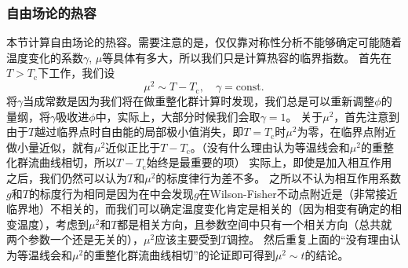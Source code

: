 \documentclass[hyperref, UTF8, a4paper]{ctexart}
\newcommand*{\const}{\mathrm{const}}
\renewcommand{\autoref}{\prettyref}
\begin{document}
\subsubsection{自由场论的热容}

本节计算自由场论的热容。需要注意的是，仅仅靠对称性分析不能够确定可能随着温度变化的系数$\gamma$, $\mu$等具体有多大，所以我们只是计算热容的临界指数。
首先在$T > T_\text{c}$下工作，我们设
\begin{equation}
    \mu^2 \sim T - T_\text{c}, \quad \gamma = \const.    
    \label{eq:mf-parameter-assumption}
\end{equation}
将$\gamma$当成常数是因为我们将在做重整化群计算时发现，我们总是可以重新调整$\phi$的量纲，将$\gamma$吸收进$\phi$中，实际上，大部分时候我们会取$\gamma=1$。
关于$\mu^2$，首先注意到由于$T$越过临界点时自由能的局部极小值消失，即$T=T_\text{c}$时$\mu^2$为零，在临界点附近做小量近似，就有$\mu^2$近似正比于$T-T_\text{c}$。（没有什么理由认为等温线会和$\mu^2$的重整化群流曲线相切，所以$T-T_\text{c}$始终是最重要的项）
实际上，即使是加入相互作用之后，我们仍然可以认为$T$和$\mu^2$的标度律行为差不多。
之所以不认为相互作用系数$g$和$T$的标度行为相同是因为在\autoref{sec:4-epsilon}中会发现$g$在Wilson-Fisher不动点附近是（非常接近临界地）不相关的，而我们可以确定温度变化肯定是相关的（因为相变有确定的相变温度），考虑到$\mu^2$和$T$都是相关方向，且参数空间中只有一个相关方向（总共就两个参数一个还是无关的），$\mu^2$应该主要受到$T$调控。
然后重复上面的“没有理由认为等温线会和$\mu^2$的重整化群流曲线相切”的论证即可得到$\mu^2 \sim t$的结论。
\end{document}
